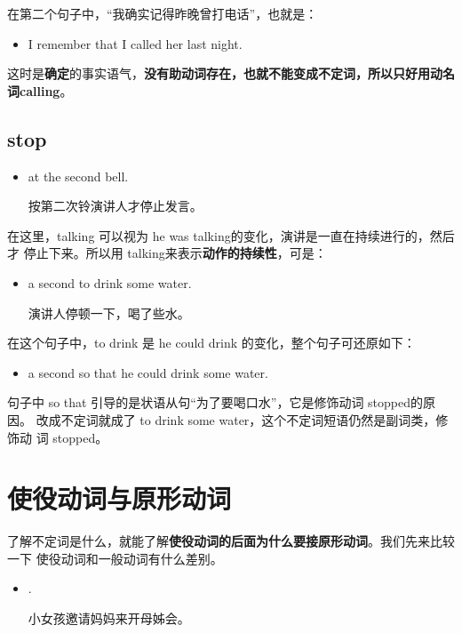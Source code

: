 在第二个句子中，“我确实记得昨晚曾打电话”，也就是：
\begin{itemize}
\item  I remember that I called her last night.
\end{itemize}
这时是\textbf{确定}的事实语气，\textbf{没有助动词存在，也就不能变成不定词，所以只好用动名
  词calling}。

\subsection{stop}

\begin{itemize}
\item {}   at the second bell.

  按第二次铃演讲人才停止发言。
\end{itemize}
在这里，talking 可以视为 he was talking的变化，演讲是一直在持续进行的，然后才
停止下来。所以用 talking来表示\textbf{动作的持续性}，可是：

\begin{itemize}
\item {}  a second to drink some water.

演讲人停顿一下，喝了些水。
\end{itemize}
在这个句子中，to drink 是 he could drink 的变化，整个句子可还原如下：
\begin{itemize}
\item {}  a second so that he could drink some water.
\end{itemize}
句子中 so that 引导的是状语从句“为了要喝口水”，它是修饰动词 stopped的原因。
改成不定词就成了 to drink some water，这个不定词短语仍然是副词类，修饰动
词 stopped。

\section{使役动词与原形动词}

了解不定词是什么，就能了解\textbf{使役动词的后面为什么要接原形动词}。我们先来比较一下
使役动词和一般动词有什么差别。

\begin{itemize}
\item {}   .

  小女孩邀请妈妈来开母姊会。
\end{itemize}

